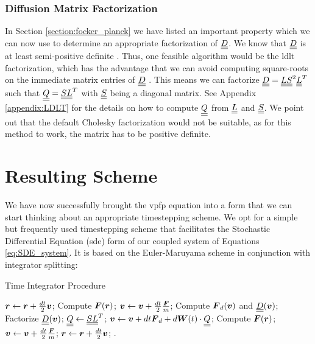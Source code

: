 \subsubsection{Diffusion Matrix Factorization}
In Section \ref{section:focker_planck} we have listed an important property which we can now 
use to determine an appropriate factorization of $\underline{\underline{D}}$.
We know that $\underline{\underline{D}}$ is at least semi-positive definite \cite{stoel}. Thus, one feasible
algorithm would be the \gls{ldlt} factorization, which has the advantage that we can avoid computing
square-roots on the immediate matrix entries of $\underline{\underline{D}}$ \cite{krishnamoorthy2013cholesky}.
This means we can factorize $\underline{\underline{D}} = \underline{\underline{L}} \underline{\underline{S}}^2 \underline{\underline{L}}^T$ such that $\underline{\underline{Q}} = \underline{\underline{S}} \underline{\underline{L}}^T$ with
$\underline{\underline{S}}$ being a diagonal matrix. See Appendix \ref{appendix:LDLT} for the details on how to compute
$\underline{\underline{Q}}$ from $\underline{\underline{L}}$ and $\underline{\underline{S}}$.
We point out that the default Cholesky factorization would not be suitable, as for this
method to work, the matrix has to be positive definite.

\section{Resulting Scheme}
\label{section:resulting_scheme}

We have now successfully brought the \gls{vpfp} equation into a form that we can start thinking about an appropriate
timestepping scheme.
We opt for a simple but frequently used timestepping scheme that facilitates the Stochastic
Differential Equation (\gls{sde}) form of
our coupled system of Equations \ref{eq:SDE_system}.
It is based on the Euler-Maruyama scheme in conjunction with integrator splitting:

\begin{algorithm}
\caption{Time Integrator Procedure}
\label{alg:integrator}
\begin{algorithmic}[1]
\State $\boldsymbol{r} \gets \boldsymbol{r} + \frac{dt}{2} \boldsymbol{v}$;
\State Compute $\boldsymbol{F}(\boldsymbol{r})$; $\boldsymbol{v} \gets \boldsymbol{v} +  \frac{dt}{2} \frac{\boldsymbol{F}}{m}$;
\hfill{}
\State Compute $\boldsymbol{F}_d(\boldsymbol{v})$ and $\underline{\underline{D}}(\boldsymbol{v})$; \hfill{}
\State Factorize $\underline{\underline{D}}(\boldsymbol{v})$; $\underline{\underline{Q}} \gets \underline{\underline{S}} \underline{\underline{L}}^T$; \hfill{}
\State $\boldsymbol{v} \gets \boldsymbol{v} + dt \boldsymbol{F}_d + d\boldsymbol{W}(t) \cdot \underline{\underline{Q}}$;
\State Compute $\boldsymbol{F}(\boldsymbol{r})$; $\boldsymbol{v} \gets \boldsymbol{v} + \frac{dt}{2} \frac{\boldsymbol{F}}{m}$;\hfill{}
\State $\boldsymbol{r} \gets \boldsymbol{r} + \frac{dt}{2} \boldsymbol{v}$;
\EndProcedure.
\end{algorithmic}
\end{algorithm}

